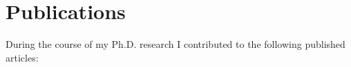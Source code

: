 \appendix
\chapter{Publications}
\label{ch_pubs}

During the course of my Ph.D. research I contributed to the following published articles:

\begin{bibunit}
\nocite{Jordan2008alt}
\nocite{Bishop2009alt}
\nocite{Sipos2011alt}
\nocite{Albers2011alt}
\nocite{LindbladToh2011alt}
\nocite{Jordan2011alt}
\def\chapter*#1{}
\renewcommand{\bibsection}{\chapter*{\bibname}}
\putbib[references]
\end{bibunit}

